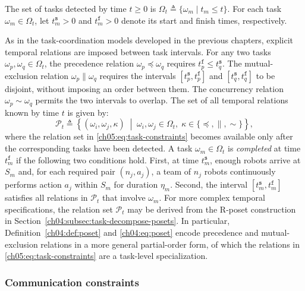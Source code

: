 \begin{definition}
The set of tasks detected by time $t \geq 0$ is
$\Omega_t \triangleq \{\omega_m \mid t_m \leq t\}$.
For each task $\omega_m \in \Omega_t$, let $t_m^{\texttt{s}} > 0$ and
$t_m^{\texttt{f}} > 0$ denote its start and finish times, respectively.
\end{definition}

As in the task-coordination models developed in the previous chapters, explicit
temporal relations are imposed between task intervals. For any two tasks
$\omega_p, \omega_q \in \Omega_t$, the precedence relation
$\omega_p \preceq \omega_q$ requires
$t_p^{\texttt{f}} \leq t_q^{\texttt{s}}$. The mutual-exclusion relation
$\omega_p \parallel \omega_q$ requires the intervals
$[t_p^{\texttt{s}}, t_p^{\texttt{f}}]$ and
$[t_q^{\texttt{s}}, t_q^{\texttt{f}}]$ to be disjoint, without imposing an
order between them. The concurrency relation $\omega_p \sim \omega_q$ permits
the two intervals to overlap. The set of all temporal relations known by time
$t$ is given by:
\begin{equation}
\mathcal{P}_t \triangleq
\left\{
(\omega_i, \omega_j, \kappa)
\;\middle|\;
\omega_i, \omega_j \in \Omega_t,\;
\kappa \in \{\preceq, \parallel, \sim\}
\right\},
\label{ch05:eq:task-constraints}
\end{equation}
where the relation set in \eqref{ch05:eq:task-constraints} becomes available
only after the corresponding tasks have been detected.
A task $\omega_m \in \Omega_t$ is \emph{completed} at time $t_m^{\texttt{f}}$ if the
following two conditions hold. First, at time $t_m^{\texttt{s}}$, enough robots
arrive at $S_m$ and, for each required pair $(n_j, a_j)$, a team of $n_j$
robots continuously performs action $a_j$ within $S_m$ for duration $\eta_m$.
Second, the interval $[t_m^{\texttt{s}}, t_m^{\texttt{f}}]$ satisfies all
relations in $\mathcal{P}_t$ that involve $\omega_m$.
For more complex temporal specifications, the relation set
$\mathcal{P}_t$ may be derived from the R-poset construction in
Section~\ref{ch04:subsec:task-decompose-posets}. In particular,
Definition~\ref{ch04:def:poset} and \eqref{ch04:eq:poset} encode precedence and
mutual-exclusion relations in a more general partial-order form, of which the
relations in \eqref{ch05:eq:task-constraints} are a task-level specialization.



\subsubsection{Communication constraints}
\label{ch05:subsec:comm-const}

